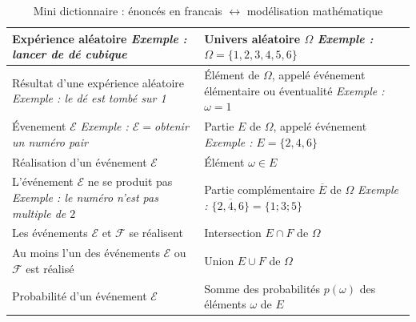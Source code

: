 \documentclass[main.tex]{subfiles}
\begin{document}
\begin{table}[!hb]
	\begin{tabularx}{1\linewidth}{|Y|Y|}\hline
		Expérience aléatoire \newline
		\emph{Exemple : lancer de dé cubique}& 
		Univers aléatoire $\Omega$ \newline
		\emph{Exemple : $\Omega=\{1,2,3,4,5,6\}$}\\ \hline
		Résultat d'une expérience aléatoire\newline
		\emph{Exemple : le dé est tombé sur 1}
		&
		Élément de $\Omega$, appelé événement élémentaire ou éventualité\newline
		\emph{Exemple : $\omega =1$}\\ \hline
		Évenement $\mathcal{E}$\newline 
		\emph{Exemple : $\mathcal{E}=$\og obtenir un numéro pair\fg{}}
		&
		Partie $E$ de $\Omega$, appelé événement \newline
		\emph{Exemple : $E=\{2,4,6\}$}\\ \hline
		Réalisation d'un événement $\mathcal{E}$ 
		&
		Élément $\omega\in E$ \\ \hline
		L'événement $\mathcal{E}$ ne se produit pas \newline
		\emph{Exemple : \og le numéro n'est pas multiple de $2$\fg{}}
		&
		Partie complémentaire $\overline{E}$ de $\Omega$\newline
		\emph{Exemple : $\overline{\{2,4,6\}}=\{1;3;5\}$}\\ \hline
		Les événements $\mathcal{E}$ et $\mathcal{F}$ se réalisent
		&
		Intersection $E\cap F$ de $\Omega$\\\hline 
		Au moins l'un des événements $\mathcal{E}$ ou $\mathcal{F}$ est réalisé
		&
		Union $E\cup F$ de $\Omega$\\\hline 
		Probabilité d'un événement $\mathcal{E}$
		&
		Somme des probabilités $p(\omega)$ des éléments $\omega$ de $E$ \\ \hline
	\end{tabularx}
	\caption{Mini dictionnaire : énoncés en francais $\leftrightarrow$ modélisation mathématique}
\end{table}
% 
\end{document}
